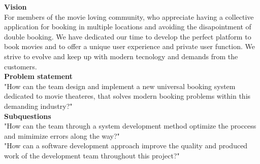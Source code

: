 \textbf{Vision} \\
For members of the movie loving community, who appreciate having a collective application for booking 
in multiple locations and avoiding the disapointment of double booking. We have dedicated our 
time to develop the perfect platform to book movies and to offer a unique user experience and private user function. 
We strive to evolve and keep up with modern tecnology and demands from the customers. \\

\textbf{Problem statement} \\
"How can the team design and implement a new universal booking system dedicated to movie theateres, 
that solves modern booking problems within this demanding industry?" \\

\textbf{Subquestions} \\
"How can the team through a system development method optimize the proccess and mimimize errors along the way?" \\

"How can a software development approach improve the quality and produced work of the development team throughout this project?"




